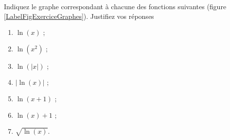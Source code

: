 
\begin{exercice}\label{exoDS2010-1-0002}

	Indiquez le graphe correspondant à chacune des fonctions suivantes (figure \ref{LabelFigExerciceGraphes}). Justifiez vos réponses
\begin{multicols}{3}
  \begin{enumerate}
  \item $\ln(x)$ ;
  \item $\ln(x^2)$ ;
  \item $\ln(|x|)$ ;
  \item $|\ln(x)|$ ;
  \item $\ln(x+1)$ ;
  \item $\ln(x)+1$ ;
  \item $\sqrt{\ln(x)}$.
  \end{enumerate}
\end{multicols}

\newcommand{\CaptionFigExerciceGraphes}{Les graphes à considérer de la question \ref{exoDS2010-1-0002}.}


\end{exercice}
